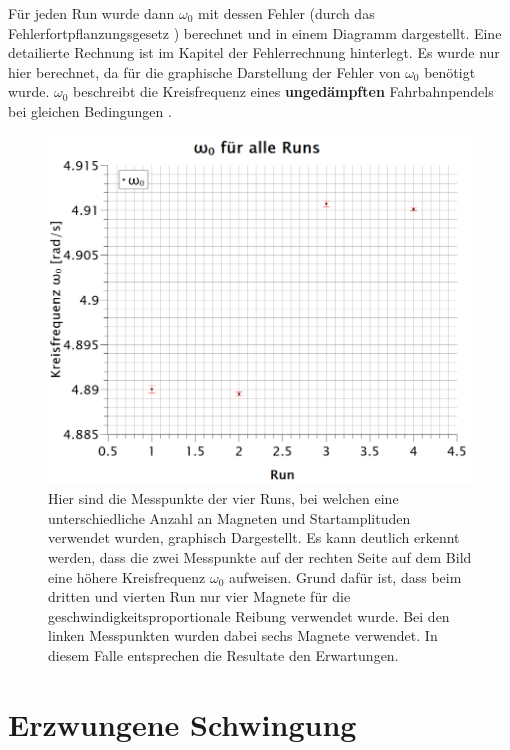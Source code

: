 Für jeden Run wurde dann $\omega_{0}$ mit dessen Fehler (durch das Fehlerfortpflanzungsgesetz \cite{TechnikFHNW2016}) berechnet und in einem Diagramm dargestellt. Eine detailierte Rechnung ist im Kapitel der Fehlerrechnung hinterlegt. Es wurde nur hier berechnet, da für die graphische Darstellung der Fehler von $\omega_{0}$ benötigt wurde. $\omega_{0}$ beschreibt die Kreisfrequenz eines \textbf{ungedämpften} Fahrbahnpendels bei gleichen Bedingungen \cite{w6}.
\newpage
\begin{figure}[h]
\centering
\includegraphics[scale=1.1]{Bilder/omega_0_fuer_alle_runs.png} 
\caption{Hier sind die Messpunkte der vier Runs, bei welchen eine unterschiedliche Anzahl an Magneten und Startamplituden verwendet wurden, graphisch Dargestellt. Es kann deutlich erkennt werden, dass die zwei Messpunkte auf der rechten Seite auf dem Bild eine höhere Kreisfrequenz $\omega_{0}$ aufweisen. Grund dafür ist, dass beim dritten und vierten Run nur vier Magnete für die geschwindigkeitsproportionale Reibung verwendet wurde. Bei den linken Messpunkten wurden dabei sechs Magnete verwendet. In diesem Falle entsprechen die Resultate den Erwartungen.}
\label{fig:omega_0}
\end{figure}
\newpage
\section{Erzwungene Schwingung}
